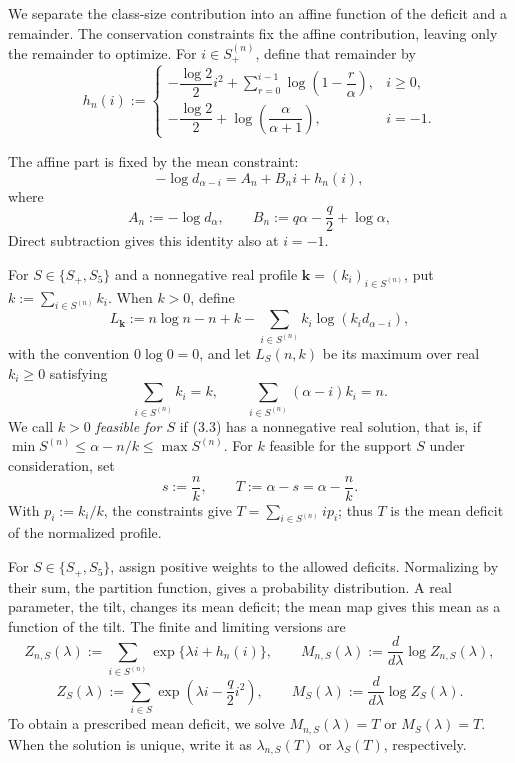 \documentclass[a4paper,10pt,reqno]{amsart}
\numberwithin{equation}{section}
\theoremstyle{plain}
\theoremstyle{remark}
\begin{document}
We separate the class-size contribution into an affine function of the
deficit and a remainder. The conservation constraints fix the affine
contribution, leaving only the remainder to optimize.
For $i\in S_+^{(n)}$, define that remainder by
\begin{equation*}
  h_n(i):=
  \begin{cases}
    -\dfrac{\log 2}{2}i^2
      +\displaystyle\sum_{r=0}^{i-1}\log\!\left(1-\dfrac r\alpha\right),
      & i\ge0,\\[1ex]
    -\dfrac{\log 2}{2}+\log\!\left(\dfrac{\alpha}{\alpha+1}\right),
      & i=-1.
  \end{cases}
  \tag{3.1a}
\end{equation*}

The affine part is fixed by the mean constraint:
\begin{equation*}
  -\log d_{\alpha-i}=A_n+B_ni+h_n(i),
  \tag{3.1b}\label{eq:root-affine}
\end{equation*}
where
\begin{equation*}
  A_n:=-\log d_\alpha,
  \qquad
  B_n:=q\alpha-\frac q2+\log\alpha,
  \tag{3.1c}\label{eq:root-affine-coefficients}
\end{equation*}
Direct subtraction gives this identity also at $i=-1$.

For $S\in\{S_+,S_5\}$ and a nonnegative real profile
$\mathbf k=(k_i)_{i\in S^{(n)}}$, put
$k:=\sum_{i\in S^{(n)}}k_i$. When $k>0$, define
\begin{equation*}
  L_{\mathbf k}
  :=n\log n-n+k-\sum_{i\in S^{(n)}} k_i\log(k_i d_{\alpha-i}),
  \tag{3.2}
\end{equation*}
with the convention $0\log0=0$, and let $L_S(n,k)$ be its maximum over
real $k_i\ge0$ satisfying
\begin{equation*}
  \sum_{i\in S^{(n)}}k_i=k,
  \qquad
  \sum_{i\in S^{(n)}}(\alpha-i)k_i=n.
  \tag{3.3}
\end{equation*}
We call $k>0$ \emph{feasible for $S$} if (3.3) has a nonnegative real
solution, that is, if $\min S^{(n)}\le\alpha-n/k\le\max S^{(n)}$.
For $k$ feasible for the support $S$ under consideration, set
\begin{equation*}
  s:=\frac nk,
  \qquad
  T:=\alpha-s=\alpha-\frac nk.
  \tag{3.4}
\end{equation*}
With $p_i:=k_i/k$, the constraints give
$T=\sum_{i\in S^{(n)}}ip_i$; thus $T$ is the mean deficit of the normalized
profile.

For $S\in\{S_+,S_5\}$, assign positive weights to the allowed deficits.
Normalizing by their sum, the partition function, gives a probability
distribution. A real parameter, the tilt, changes its mean deficit; the mean
map gives this mean as a function of the tilt. The finite and limiting
versions are
\[
  Z_{n,S}(\lambda)
  :=\sum_{i\in S^{(n)}}\exp\{\lambda i+h_n(i)\},
  \qquad
  M_{n,S}(\lambda):=\frac{d}{d\lambda}\log Z_{n,S}(\lambda),
\]
\[
  Z_S(\lambda)
  :=\sum_{i\in S}\exp\!\left(\lambda i-\frac q2i^2\right),
  \qquad
  M_S(\lambda):=\frac{d}{d\lambda}\log Z_S(\lambda).
\]
To obtain a prescribed mean deficit, we solve $M_{n,S}(\lambda)=T$ or
$M_S(\lambda)=T$. When the solution is unique, write it as
$\lambda_{n,S}(T)$ or $\lambda_S(T)$, respectively.
\end{document}
